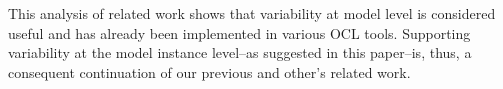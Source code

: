 This analysis of related work shows that variability at model level is
considered useful and has already been implemented in various OCL tools.
Supporting variability at the model instance level--as suggested in this paper--is, 
thus, a consequent continuation of our previous
and other's related work.